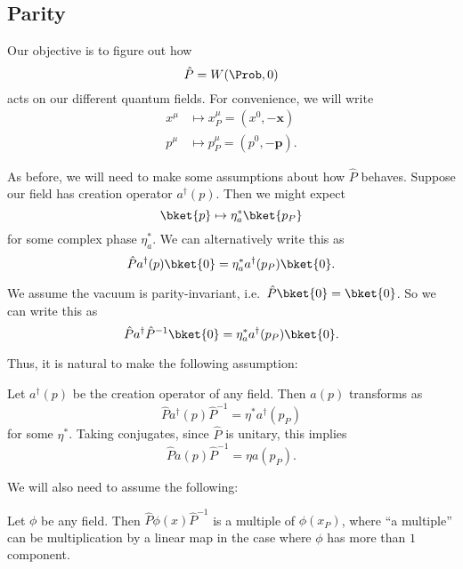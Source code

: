 \documentclass[a4paper]{article}
\begin{document}
\subsection{Parity}
Our objective is to figure out how
\[
  \hat{P} = W(\Prob, 0)
\]
acts on our different quantum fields. For convenience, we will write
\begin{align*}
  x^\mu &\mapsto x^\mu_P = (x^0, -\mathbf{x})\\
  p^\mu &\mapsto p^\mu_P = (p^0, -\mathbf{p}).
\end{align*}

As before, we will need to make some assumptions about how $\hat{P}$ behaves. Suppose our field has creation operator $a^\dagger(p)$. Then we might expect
\[
  \bket{p} \mapsto \eta^*_a\bket{p_P}
\]
for some complex phase $\eta^*_a$. We can alternatively write this as
\[
  \hat{P}a^\dagger(p) \bket{0} = \eta_a^* a^\dagger(p_P)\bket{0}.
\]

We assume the vacuum is parity-invariant, i.e.\ $\hat{P}\bket{0} = \bket{0}$. So we can write this as
\[
  \hat{P}a^\dagger \hat{P}^{-1}\bket{0} = \eta_a^* a^\dagger(p_P) \bket{0}.
\]

Thus, it is natural to make the following assumption:

\begin{assumption}
  Let $a^\dagger(p)$ be the creation operator of any field. Then $a(p)$ transforms as
  \[
    \hat{P} a^\dagger (p) \hat{P}^{-1} = \eta^* a^\dagger(p_P)
  \]
  for some $\eta^*$. Taking conjugates, since $\hat{P}$ is unitary, this implies
  \[
    \hat{P} a(p) \hat{P}^{-1} = \eta a(p_P).
  \]
\end{assumption}
We will also need to assume the following:
\begin{assumption}
  Let $\phi$ be any field. Then $\hat{P} \phi(x) \hat{P}^{-1}$ is a multiple of $\phi(x_P)$, where ``a multiple'' can be multiplication by a linear map in the case where $\phi$ has more than $1$ component.
\end{assumption}
\end{document}
